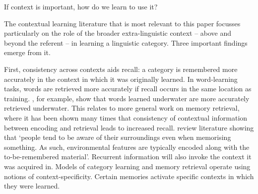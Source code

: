 \documentclass{frontiersSCNS} %
\begin{document}
If context is important, how do we learn to use it?



The contextual learning literature that is most relevant to this paper focusses particularly on the role of the broader extra-linguistic context -- above and beyond the referent -- in learning a linguistic category. Three important findings emerge from it. 

First, consistency across contexts aids recall: a category is remembered more accurately in the context in which it was originally learned.  In word-learning tasks, words are retrieved more accurately if recall occurs in the same location as training.   \cite{godden1975context}, for example, show that words learned underwater are more accurately retrieved underwater.   This relates to more general work on memory retrieval, where it has been shown many times that consistency of contextual information between encoding and retrieval leads to increased recall. \cite{smith2001environmental} review literature showing that `people tend to be aware of their surroundings even when memorising something. As such, environmental features are typically encoded along with the to-be-remembered material'. Recurrent information will also invoke the context it was acquired in. Models of category learning and memory retrieval \citep{ratcliff1978theory,grossberg1987competitive} operate using notions of context-specificity. Certain memories activate specific contexts in which they were learned. 
\end{document}
